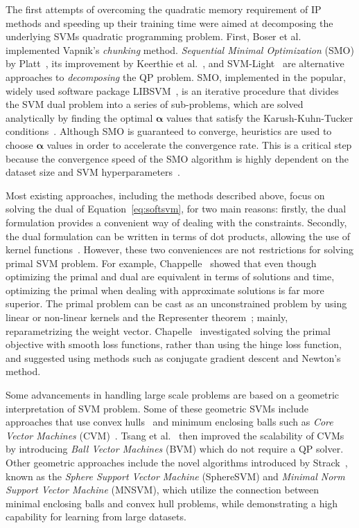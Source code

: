 \documentclass[reqno]{vcuthesis}
\numberwithin{equation}{chapter}
\begin{document}
The first attempts of overcoming the quadratic memory requirement of IP methods and speeding up their training time were aimed at decomposing the underlying SVMs quadratic programming problem. First, Boser et al.~\cite{boser1992training} implemented Vapnik's \textit{chunking} method. \textit{Sequential Minimal Optimization} (SMO) by Platt~\cite{Platt1998}, its improvement by Keerthie et al.~\cite{keerthi2001improvements}, and SVM-Light~\cite{Joachims1999} are alternative approaches to \textit{decomposing} the QP problem. SMO, implemented in the popular, widely used software package LIBSVM~\cite{CC01a}, is an iterative procedure that divides the SVM dual problem into a series of sub-problems, which are solved analytically by finding the optimal $\bm \alpha$ values that satisfy the Karush-Kuhn-Tucker conditions~\cite{Boyd2004}. Although SMO is guaranteed to converge, heuristics are used to choose $\bm \alpha$ values in order to accelerate the convergence rate. This is a critical step because the convergence speed of the SMO algorithm is highly dependent on the dataset size and SVM hyperparameters~\cite{Schoelkopf2002}.

Most existing approaches, including the methods described above, focus on solving the dual of Equation~\ref{eq:softsvm}, for two main reasons: firstly, the dual formulation provides a convenient way of dealing with the constraints. Secondly, the dual formulation can be written in terms of dot products, allowing the use of kernel functions~\cite{bottou2007large}. However, these two conveniences are not restrictions for solving primal SVM problem. For example, Chappelle~\cite{Chapelle2007} showed that even though optimizing the primal and dual are equivalent in terms of solutions and time, optimizing the primal when dealing with approximate solutions is far more superior. The primal problem can be cast as an unconstrained problem by using linear or non-linear kernels and the Representer theorem~\cite{scholkopf2001generalized}; mainly, reparametrizing the weight vector. Chapelle~\cite{Chapelle2007} investigated solving the primal objective with smooth loss functions, rather than using the hinge loss function, and suggested using methods such as conjugate gradient descent and Newton's method.

Some advancements in handling large scale problems are based on a geometric interpretation of SVM problem. Some of these geometric SVMs include approaches that use convex hulls~\cite{bennett2000duality} and minimum enclosing balls such as \textit{Core Vector Machines} (CVM)~\cite{tsang2005core}. Tsang et al.~\cite{tsang2007simpler} then improved the scalability of CVMs by introducing \textit{Ball Vector Machines} (BVM) which do not require a QP solver. Other geometric approaches include the novel algorithms introduced by Strack~\cite{strack2013geometric}, known as the \textit{Sphere Support Vector Machine} (SphereSVM) and \textit{Minimal Norm Support Vector Machine} (MNSVM), which utilize the connection between minimal enclosing balls and convex hull problems, while demonstrating a high capability for learning from large datasets. 
\end{document}
